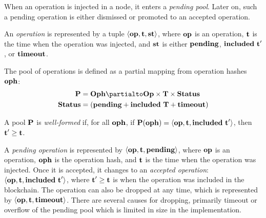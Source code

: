 \documentclass[a4paper]{llncs}
\begin{document}
When an operation is injected in a node, it enters a \emph{pending
  pool}. Later on, such a pending operation is either dismissed or
promoted to an accepted operation.

 \begin{definition}%
An \emph{operation} is represented by a tuple  $\langle  \textbf{op}, \textbf{t}, \textbf{st}
\rangle $, where $\textbf{op}$ is an operation, $\textbf{t}$ is the time when the
operation was injected, and $\textbf{st}$ is either $\textbf{pending}$,
$\textbf{included}\ \textbf{t}'$, or $\textbf{timeout}$.  
\end{definition}
\begin{definition}
  The pool of operations is defined as a partial mapping from
  operation hashes $\textbf{oph}$:
  \begin{align*}
    \PENDING &= \TOPH \partialto \TOP\times \TTIME \times \TSTATUS \\
    \TSTATUS&= (\STATUSPENDING + \STATUSINCLUDED\ \TTIME + \STATUSTIMEOUT)
  \end{align*}
  
  A pool $\textbf{P}$ is \emph{well-formed} if, for all $\textbf{oph}$, if $\textbf{P} (\textbf{oph}) =
  \langle\textbf{op},\textbf{t}, \textbf{included}\ \textbf{t}'\rangle$, 
  then $\textbf{t}' \ge \textbf{t}$.
\end{definition}


A \emph{pending operation} is represented by
$\langle  \textbf{op}, \textbf{t}, \textbf{pending}\rangle $,
where $\textbf{op}$ is an operation, $\textbf{oph}$ is the operation hash,
and $\textbf{t}$ is the time when the operation was injected.
Once it is accepted, it changes to an \emph{accepted operation}:
$\langle  \textbf{op}, \textbf{t}, \textbf{included}\ \textbf{t}'\rangle $, where
$\textbf{t}' \ge \textbf{t}$ is  when the operation was included in the
blockchain.  The operation can also be dropped at any time, which is
represented by
$\langle  \textbf{op}, \textbf{t}, \textbf{timeout}\rangle $. There are several
causes for dropping, primarily timeout or overflow of the pending
pool which is limited in size in the implementation.



\end{document}
